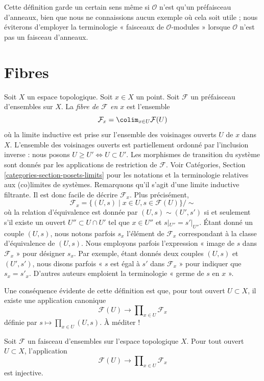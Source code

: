 \noindent
Cette définition garde un certain sens même si $\mathcal{O}$ n'est qu'un
préfaisceau d'anneaux, bien que nous ne connaissions aucun exemple où
cela soit utile ; nous éviterons d'employer la terminologie
« faisceaux de $\mathcal{O}$-modules »
lorsque $\mathcal{O}$ n'est pas un faisceau d'anneaux.






\section{Fibres}
\label{section-stalks}

\noindent
Soit $X$ un espace topologique. Soit $x \in X$ un point.
Soit $\mathcal{F}$ un préfaisceau d'ensembles sur $X$.
La {\it fibre de $\mathcal{F}$ en $x$} est l'ensemble
$$
\mathcal{F}_x
=
\colim_{x\in U} \mathcal{F}(U)
$$
où la limite inductive est prise sur l'ensemble des voisinages ouverts
$U$ de $x$ dans $X$. L'ensemble des voisinages ouverts est
partiellement ordonné par l'inclusion inverse :
nous posons $U \geq U' \Leftrightarrow U \subset U'$.
Les morphismes de transition du système sont
donnés par les applications de restriction de $\mathcal{F}$.
Voir Catégories, Section \ref{categories-section-posets-limits}
pour les notations et la terminologie relatives aux (co)limites de systèmes.
Remarquons qu'il s'agit d'une limite inductive filtrante.
Il est donc facile de décrire $\mathcal{F}_x$. Plus précisément,
$$
\mathcal{F}_x
=
\{
(U, s)
\mid
x\in U, s\in \mathcal{F}(U)
\}/\sim
$$
où la relation d'équivalence est donnée par $(U, s) \sim (U', s')$ si et seulement s'il
existe un ouvert $U'' \subset U \cap U'$ tel que $x \in U''$ et
$s|_{U''} = s'|_{U''}$. Étant donné un couple $(U, s)$, nous notons parfois
$s_x$ l'élément de $\mathcal{F}_x$ correspondant à la classe d'équivalence
de $(U, s)$. Nous employons parfois l'expression
« image de $s$ dans $\mathcal{F}_x$ » pour désigner $s_x$.
Par exemple, étant donnés deux couples $(U, s)$ et $(U', s')$, nous disons parfois
« $s$ est égal à $s'$ dans $\mathcal{F}_x$ » pour indiquer
que $s_x = s'_x$. D'autres auteurs emploient la terminologie
« germe de $s$ en $x$ ».

\medskip\noindent
Une conséquence évidente de cette définition est que,
pour tout ouvert $U \subset X$, il existe une application canonique
$$
\mathcal{F}(U)
\longrightarrow
\prod\nolimits_{x \in U} \mathcal{F}_x
$$
définie par $s \mapsto \prod_{x \in U} (U, s)$. À méditer !

\begin{lemma}
\label{lemma-sheaf-subset-stalks}
Soit $\mathcal{F}$ un faisceau d'ensembles sur l'espace topologique $X$.
Pour tout ouvert $U \subset X$, l'application
$$
\mathcal{F}(U)
\longrightarrow
\prod\nolimits_{x \in U} \mathcal{F}_x
$$
est injective.
\end{lemma}

